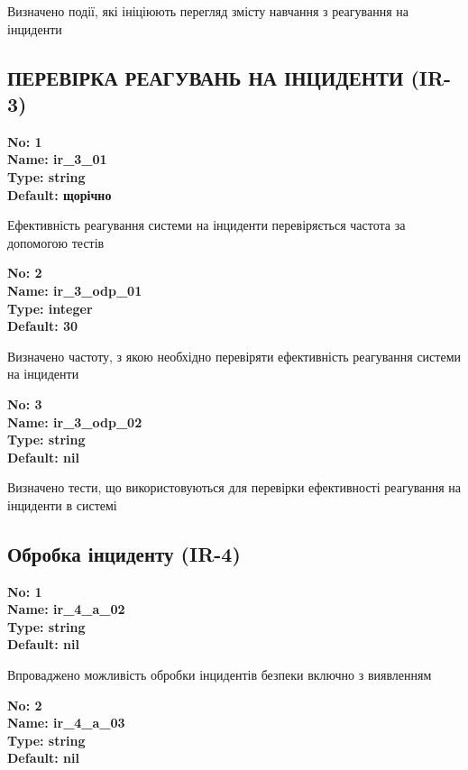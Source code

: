 \documentclass{article}
\begin{document}
{\footnotesize Визначено події, які ініціюють перегляд змісту навчання з реагування на інциденти}




\subsection{ПЕРЕВІРКА РЕАГУВАНЬ НА ІНЦИДЕНТИ (IR-3)}


\vspace{10pt}
{\footnotesize\bfseries
No: 1\\
Name: ir\_\allowbreak{}3\_\allowbreak{}01\\
Type: string\\
Default: \textquotedbl{}щорічно\textquotedbl{}
}

{\footnotesize Ефективність реагування системи на інциденти перевіряється частота за допомогою тестів}


{\footnotesize\bfseries
No: 2\\
Name: ir\_\allowbreak{}3\_\allowbreak{}odp\_\allowbreak{}01\\
Type: integer\\
Default: 30
}

{\footnotesize Визначено частоту, з якою необхідно перевіряти ефективність реагування системи на інциденти}


{\footnotesize\bfseries
No: 3\\
Name: ir\_\allowbreak{}3\_\allowbreak{}odp\_\allowbreak{}02\\
Type: string\\
Default: nil
}

{\footnotesize Визначено тести, що використовуються для перевірки ефективності реагування на інциденти в системі}




\subsection{Обробка інциденту (IR-4)}


\vspace{10pt}
{\footnotesize\bfseries
No: 1\\
Name: ir\_\allowbreak{}4\_\allowbreak{}a\_\allowbreak{}02\\
Type: string\\
Default: nil
}

{\footnotesize Впроваджено можливість обробки інцидентів безпеки включно з виявленням}


{\footnotesize\bfseries
No: 2\\
Name: ir\_\allowbreak{}4\_\allowbreak{}a\_\allowbreak{}03\\
Type: string\\
Default: nil
}
\end{document}
